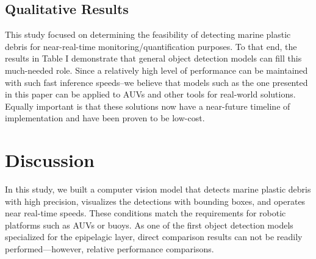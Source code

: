 \documentclass[a4paper,fleqn]{cas-dc}
\begin{document}
\subsection{Qualitative Results}
This study focused on determining the feasibility of detecting marine plastic debris for near-real-time monitoring/quantification purposes. To that end, the results in Table I demonstrate that general object detection models can fill this much-needed role. Since a relatively high level of performance can be maintained with such fast inference speeds–we believe that models such as the one presented in this paper can be applied to AUVs and other tools for real-world solutions. Equally important is that these solutions now have a near-future timeline of implementation and have been proven to be low-cost.





\section{Discussion}
\label{sec:disc}
In this study, we built a computer vision model that detects marine plastic debris with high precision, visualizes the detections with bounding boxes, and operates near real-time speeds. These conditions match the requirements for robotic platforms such as AUVs or buoys.
As one of the first object detection models specialized for the epipelagic layer, direct comparison results can not be readily performed—however, relative performance comparisons.
\end{document}
